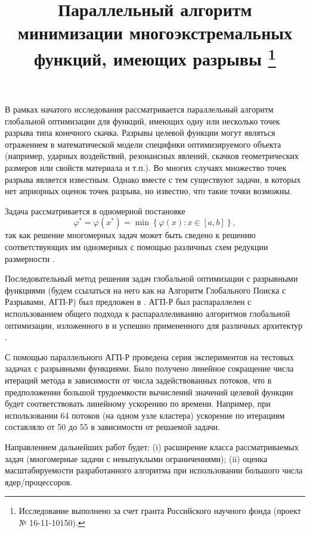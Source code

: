 \documentclass[11pt, oneside, a4paper]{article}
\begin{document}

\title{Параллельный алгоритм минимизации многоэкстремальных функций, имеющих разрывы \footnote{Исследование выполнено за счет гранта Российского научного фонда (проект № 16-11-10150).}}


В рамках начатого исследования рассматривается параллельный алгоритм глобальной оптимизации для функций, имеющих одну или несколько точек разрыва типа конечного скачка. Разрывы целевой функции могут являться отражением в математической модели специфики оптимизируемого объекта (например, ударных воздействий, резонансных явлений, скачков геометрических размеров или свойств материала и т.п.). Во многих случаях множество точек разрыва является известным. Однако вместе с тем существуют задачи, в которых нет априорных оценок точек разрыва, но известно, что такие точки возможны. 

Задача рассматривается в одномерной постановке
\[
\varphi^* = \varphi(x^*)=\min\left\{\varphi(x):x\in[a,b]\right\},
\] 
так как решение многомерных задач может быть сведено к решению соответствующих им одномерных с помощью различных схем редукции размерности \cite{Strongin91}.

Последовательный метод решения задач глобальной оптимизации с разрывными функциями (будем ссылаться на него как на Алгоритм Глобального Поиска с Разрывами, АГП-Р) был предложен в \cite{Strongin91}.
АГП-Р был распараллелен с использованием общего подхода к распараллеливанию алгоритмов глобальной оптимизации, изложенного в \cite{Strongin13} и успешно примененного для различных архитектур \cite{Barkalov14,Barkalov16}.

С помощью параллельного АГП-Р проведена серия экспериментов на тестовых задачах с разрывными функциями.
Было получено линейное сокращение числа итераций метода в зависимости от числа задействованных потоков, что в предположении большой трудоемкости вычислений значений целевой функции будет соответствовать линейному ускорению по времени. Например, при использовании 64 потоков (на одном узле кластера) ускорение по итерациям составляло от 50 до 55 в зависимости от решаемой задачи.

Направлением дальнейших работ будет: (i) расширение класса рассматриваемых задач (многомерные задачи с невыпуклыми ограничениями); (ii) оценка масштабируемости разработанного алгоритма при использовании большого числа ядер/процессоров.
\end{document}

